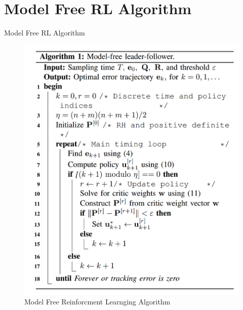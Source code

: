 \documentclass{beamer}
\begin{document}
\section{Model Free RL Algorithm}
\begin{frame}{Model Free RL Algorithm}
\begin{center}
\begin{figure}
\includegraphics[scale=0.13]{figs/img/algorithm1}
\caption{Model Free Reinforcment Learnging Algorithm}
\end{figure}
\end{center}
\end{frame}
\end{document}
